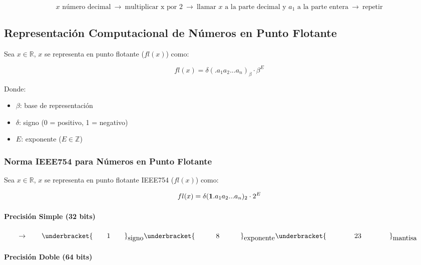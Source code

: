 \[
\text{$x$ número decimal} \  \rightarrow \
\text{multiplicar x por 2} \  \rightarrow \
\text{llamar $x$ a la parte decimal y $a_1$ a la parte entera} \  \rightarrow \
\text{repetir}
\]

\hypertarget{representaciuxf3n-computacional-de-nuxfameros-en-punto-flotante}{%
\subsection{Representación Computacional de Números en Punto
Flotante}\label{representaciuxf3n-computacional-de-nuxfameros-en-punto-flotante}}

Sea \(x \in \ensuremath{\mathbb{R}}\), \(x\) se representa en punto
flotante (\(fl(x)\)) como:

\[ 
fl(x) = \delta(. a_1 a_2 ... a_n)_\beta \cdot \beta^E 
\]

Donde:

\begin{itemize}
\tightlist
\item
  \(\beta\): base de representación
\item
  \(\delta\): signo (0 = positivo, 1 = negativo)
\item
  \(E\): exponente (\(E \in \ensuremath{\mathbb{Z}}\))
\end{itemize}

\hypertarget{norma-ieee754-para-nuxfameros-en-punto-flotante}{%
\subsubsection{Norma IEEE754 para Números en Punto
Flotante}\label{norma-ieee754-para-nuxfameros-en-punto-flotante}}

Sea \(x \in \ensuremath{\mathbb{R}}\), \(x\) se representa en punto
flotante IEEE754 (\(fl(x)\)) como:

\[ 
fl(x) = \delta(\text{\textbf{1}}. a_1 a_2 ... a_n)_2 \cdot 2^E 
\]

\hypertarget{precisiuxf3n-simple-32-bits}{%
\paragraph{Precisión Simple (32
bits)}\label{precisiuxf3n-simple-32-bits}}

\(\qquad\rightarrow\qquad\underbracket{\hbox{\qquad1\qquad}}_{\hbox{signo}} \underbracket{\hbox{\quad\qquad8\quad\qquad}}_{\hbox{exponente}} \underbracket{\hbox{\qquad\qquad23\qquad\qquad}}_{\hbox{mantisa}}\)

\hypertarget{precisiuxf3n-doble-64-bits}{%
\paragraph{Precisión Doble (64 bits)}\label{precisiuxf3n-doble-64-bits}}

